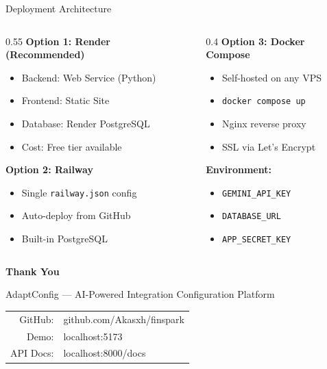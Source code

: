\documentclass[aspectratio=169,11pt]{beamer}
\begin{document}
\begin{frame}{Deployment Architecture}
\begin{columns}
\begin{column}{0.55\textwidth}
\textbf{Option 1: Render (Recommended)}
\begin{itemize}
    \item Backend: Web Service (Python)
    \item Frontend: Static Site
    \item Database: Render PostgreSQL
    \item Cost: Free tier available
\end{itemize}
\vspace{0.5em}
\textbf{Option 2: Railway}
\begin{itemize}
    \item Single \texttt{railway.json} config
    \item Auto-deploy from GitHub
    \item Built-in PostgreSQL
\end{itemize}
\end{column}
\begin{column}{0.4\textwidth}
\textbf{Option 3: Docker Compose}
\begin{itemize}
    \item Self-hosted on any VPS
    \item \texttt{docker compose up}
    \item Nginx reverse proxy
    \item SSL via Let's Encrypt
\end{itemize}
\vspace{0.5em}
\textbf{Environment:}
\begin{itemize}
    \item \texttt{GEMINI\_API\_KEY}
    \item \texttt{DATABASE\_URL}
    \item \texttt{APP\_SECRET\_KEY}
\end{itemize}
\end{column}
\end{columns}
\end{frame}

\begin{frame}[plain]
\begin{center}
\vspace{2cm}
{\Huge\bfseries Thank You}
\vspace{1em}

{\large\color{fsteal} AdaptConfig --- AI-Powered Integration Configuration Platform}
\vspace{1.5em}

{\color{fsmuted}
\begin{tabular}{rl}
GitHub: & github.com/Akasxh/finspark \\
Demo: & localhost:5173 \\
API Docs: & localhost:8000/docs \\
\end{tabular}
}
\end{center}
\end{frame}
\end{document}
